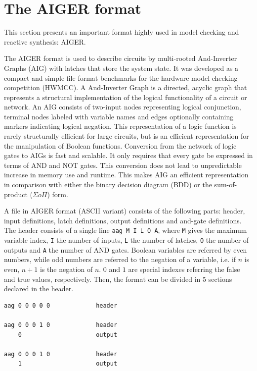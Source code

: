 
\section{The AIGER format}

This section presents an important format highly used in model checking and reactive synthesis: AIGER. 

The AIGER format is used to describe circuits by multi-rooted And-Inverter Graphs (AIG) with latches that store the system state. It was developed as a compact and simple file format benchmarks for the hardware model checking competition (HWMCC). 
A And-Inverter Graph is a directed, acyclic graph that represents a structural implementation of the logical functionality of a circuit or network. An AIG consists of two-input nodes representing logical conjunction, terminal nodes labeled with variable names and edges optionally containing markers indicating logical negation. This representation of a logic function is rarely structurally efficient for large circuits, but is an efficient representation for the manipulation of Boolean functions.
Conversion from the network of logic gates to AIGs is fast and scalable. It only requires that every gate be expressed in terms of AND and NOT gates.
This conversion does not lead to unpredictable increase in memory use and runtime. This makes AIG an efficient representation in comparison with either the binary decision diagram (BDD) or the sum-of-product ($\Sigma o \Pi$) form.


A file in AIGER format (ASCII variant) consists of the following parts: header, input definitions, latch definitions, output definitions and and-gate definitions. The header consists of a single line \lstinline{aag M I L O A}, where \lstinline{M} gives the maximum variable index, \lstinline{I} the number of inputs, \lstinline{L} the number of latches, \lstinline{O} the number of outputs and \lstinline{A} the number of AND gates.
Boolean variables are referred by even numbers, while odd numbers are referred to the negation of a variable, i.e. if $n$ is even, $n+1$ is the negation of $n$. $0$ and $1$ are special indexes referring the false and true values, respectively.
Then, the format can be divided in 5 sections declared in the header.

\begin{lstlisting}[caption=The empty circuit without inputs nor outputs and constant false/true in AIGER format]
aag 0 0 0 0 0             header

aag 0 0 0 1 0             header
    0                     output

aag 0 0 0 1 0             header
    1                     output
\end{lstlisting}

